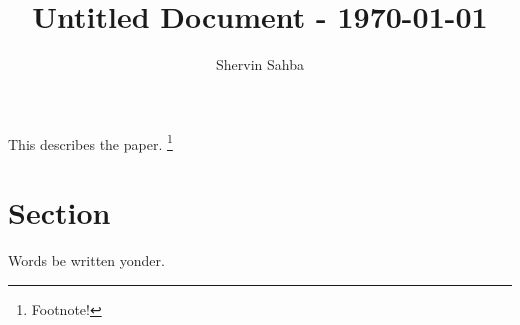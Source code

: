 \documentclass{shervin} %
\begin{document}
\title{Untitled Document - \today}
\author{Shervin Sahba\authormark{}}
\address{\authormark{}University of Washington}

\begin{abstract*}
This describes the paper. \footnote{Footnote!}
\end{abstract*}



\section{Section} \label{sec: }

Words be written yonder.\cite{DUMMYEXAMPLE}

%		







\printbibliography \label{sec: References}
\end{document}

